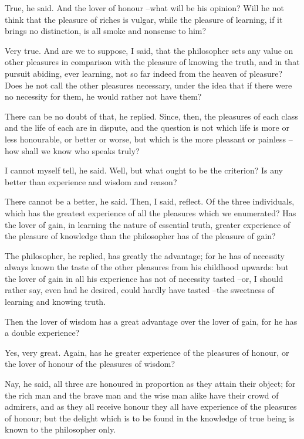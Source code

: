 True, he said.
And the lover of honour --what will be his opinion? Will he not think that the pleasure of riches is vulgar, while the pleasure of learning, if it brings no distinction, is all smoke and nonsense to him?

Very true.
And are we to suppose, I said, that the philosopher sets any value on other pleasures in comparison with the pleasure of knowing the truth, and in that pursuit abiding, ever learning, not so far indeed from the heaven of pleasure? Does he not call the other pleasures necessary, under the idea that if there were no necessity for them, he would rather not have them?

There can be no doubt of that, he replied.
Since, then, the pleasures of each class and the life of each are in dispute, and the question is not which life is more or less honourable, or better or worse, but which is the more pleasant or painless --how shall we know who speaks truly?

I cannot myself tell, he said.
Well, but what ought to be the criterion? Is any better than experience and wisdom and reason?

There cannot be a better, he said.
Then, I said, reflect. Of the three individuals, which has the greatest experience of all the pleasures which we enumerated? Has the lover of gain, in learning the nature of essential truth, greater experience of the pleasure of knowledge than the philosopher has of the pleasure of gain?

The philosopher, he replied, has greatly the advantage; for he has of necessity always known the taste of the other pleasures from his childhood upwards: but the lover of gain in all his experience has not of necessity tasted --or, I should rather say, even had he desired, could hardly have tasted --the sweetness of learning and knowing truth.

Then the lover of wisdom has a great advantage over the lover of gain, for he has a double experience?

Yes, very great.
Again, has he greater experience of the pleasures of honour, or the lover of honour of the pleasures of wisdom?

Nay, he said, all three are honoured in proportion as they attain their object; for the rich man and the brave man and the wise man alike have their crowd of admirers, and as they all receive honour they all have experience of the pleasures of honour; but the delight which is to be found in the knowledge of true being is known to the philosopher only.

